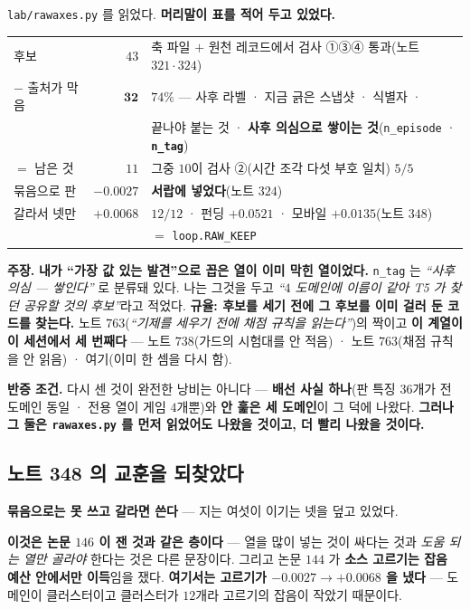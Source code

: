 \documentclass[10pt,a4paper]{article}
\newcommand{\claim}[2]{\begin{claimbox}\textbf{주장.} #1\par\smallskip
  \textcolor{gray!70}{\textbf{반증 조건.} #2}\end{claimbox}}
\begin{document}
\texttt{lab/rawaxes.py} 를 읽었다. \textbf{머리말이 표를 적어 두고 있었다.}

\begin{center}
\begin{tabular}{lr l}
\toprule
후보 & $43$ & 축 파일 $+$ 원천 레코드에서 검사 ①③④ 통과(노트 $321 \cdot 324$) \\
$-$ 출처가 막음 & $\mathbf{32}$ & $74\%$ --- 사후 라벨 · 지금 긁은 스냅샷 · 식별자 · \\
& & 끝나야 붙는 것 · \textbf{사후 의심으로 쌓이는 것}(\texttt{n\_episode} · \textbf{\texttt{n\_tag}}) \\
$=$ 남은 것 & $11$ & 그중 \textbf{$10$}이 검사 ②(시간 조각 다섯 부호 일치) $5/5$ \\
\midrule
묶음으로 판 & $\mathbf{-0.0027}$ & \textbf{서랍에 넣었다}(노트 $324$) \\
갈라서 넷만 & $\mathbf{+0.0068}$ & $12/12$ · 펀딩 $+0.0521$ · 모바일 $+0.0135$(노트 $348$) \\
& & $=$ \texttt{loop.RAW\_KEEP} \\
\bottomrule
\end{tabular}
\end{center}

\claim{\textbf{내가 ``가장 값 있는 발견''으로 꼽은 열이 이미 막힌 열이었다.}
\texttt{n\_tag} 는 \emph{``사후 의심 --- 쌓인다''} 로 분류돼 있다. 나는 그것을 두고
\emph{``$4$ 도메인에 이름이 같아 T5 가 찾던 공유할 것의 후보''}라고 적었다. \textbf{규율:
후보를 세기 전에 그 후보를 이미 걸러 둔 코드를 찾는다.} 노트 $763$(\emph{``기제를
세우기 전에 채점 규칙을 읽는다''})의 짝이고 \textbf{이 계열이 이 세션에서 세
번째다} --- 노트 $738$(가드의 시험대를 안 적음) · 노트 $763$(채점 규칙을 안 읽음) ·
여기(이미 한 셈을 다시 함).}
{다시 센 것이 완전한 낭비는 아니다 --- \textbf{배선 사실 하나}(판 특징 $36$개가 전
도메인 동일 · 전용 열이 게임 $4$개뿐)와 \textbf{안 훑은 세 도메인}이 그 덕에 나왔다.
\textbf{그러나 그 둘은 \texttt{rawaxes.py} 를 먼저 읽었어도 나왔을 것이고, 더 빨리
나왔을 것이다.}}

\subsection*{노트 348 의 교훈을 되찾았다}

\begin{center}
\textbf{묶음으로는 못 쓰고 갈라면 쓴다} --- 지는 여섯이 이기는 넷을 덮고 있었다.
\end{center}

\textbf{이것은 논문 $146$ 이 잰 것과 같은 층이다} --- 열을 많이 넣는 것이 싸다는 것과
\emph{도움 되는 열만 골라야} 한다는 것은 다른 문장이다. 그리고 논문 $144$ 가
\textbf{소스 고르기는 잡음 예산 안에서만 이득}임을 쟀다. \textbf{여기서는 고르기가
$-0.0027 \to +0.0068$ 을 냈다} --- 도메인이 클러스터이고 클러스터가 $12$개라 고르기의
잡음이 작았기 때문이다.
\end{document}
